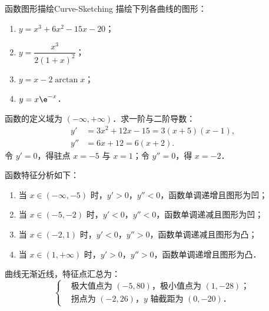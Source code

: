 \begin{problem}{函数图形描绘}{Curve-Sketching}
    描绘下列各曲线的图形：
    \begin{enumerate}
        \item $y = x^3 + 6x^2 - 15x - 20$；
        \item $y = \dfrac{x^3}{2(1+x)^2}$；
        \item $y = x - 2\arctan x$；
        \item $y = x \e^{-x}$．
    \end{enumerate}
\end{problem}

\begin{solution}

    函数的定义域为 $(-\infty, +\infty)$．求一阶与二阶导数：
    \begin{equation}
        \begin{aligned}
            y'  & = 3x^2 + 12x - 15 = 3(x+5)(x-1), \\
            y'' & = 6x + 12 = 6(x+2).
        \end{aligned}
    \end{equation}
    令 $y' = 0$，得驻点 $x = -5$ 与 $x = 1$；令 $y'' = 0$，得 $x = -2$．

    函数特征分析如下：
    \begin{enumerate}
        \item 当 $x \in (-\infty, -5)$ 时，$y' > 0$，$y'' < 0$，函数单调递增且图形为凹；
        \item 当 $x \in (-5, -2)$ 时，$y' < 0$，$y'' < 0$，函数单调递减且图形为凹；
        \item 当 $x \in (-2, 1)$ 时，$y' < 0$，$y'' > 0$，函数单调递减且图形为凸；
        \item 当 $x \in (1, +\infty)$ 时，$y' > 0$，$y'' > 0$，函数单调递增且图形为凸．
    \end{enumerate}
    曲线无渐近线，特征点汇总为：
    \begin{equation}
        \boxed{
            \left\{
            \begin{aligned}
                 & \text{极大值点为 } (-5, 80)\text{，极小值点为 } (1, -28)\text{；}        \\
                 & \text{拐点为 } (-2, 26)\text{，}y \text{ 轴截距为 } (0, -20)\text{．}
            \end{aligned}
            \right.
        }
    \end{equation}

    \begin{center}
\end{center}
\end{solution}
